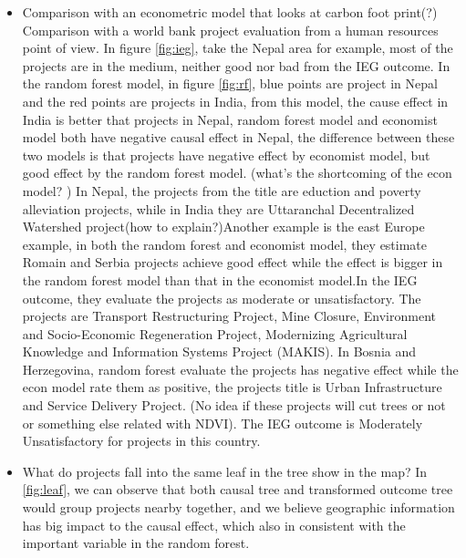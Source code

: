 \begin{itemize}
\item Comparison with an econometric model that looks at carbon foot print(?) Comparison with a world bank project evaluation from a human resources point of view.  In figure \ref{fig:ieg}, take the Nepal area for example, most of the projects are in the medium, neither good nor bad from the IEG outcome. In the random forest model, in figure \ref{fig:rf}, blue points are project in Nepal and the red points are projects in India, from this model, the cause effect in India is better that projects in Nepal, random forest model and economist model both have negative causal effect in Nepal, the difference between these two models is that projects have negative effect by economist model, but good effect by the random forest model. (what's the shortcoming of the econ model? ) In Nepal, the projects from the title are eduction and poverty alleviation projects, while in India they are Uttaranchal Decentralized Watershed project(how to explain?)Another example is the east Europe example, in both the random forest and economist model, they estimate Romain and Serbia projects achieve good effect while the effect is bigger in the random forest model than that in the economist model.In the IEG outcome, they evaluate the projects as moderate or unsatisfactory. The projects are Transport Restructuring Project, Mine Closure, Environment and Socio-Economic Regeneration Project, Modernizing Agricultural Knowledge and Information Systems Project (MAKIS).
In Bosnia and Herzegovina, random forest evaluate the projects has negative effect while the econ model rate them as positive, the projects title is Urban Infrastructure and Service Delivery Project. (No idea if these projects will cut trees or not or something else related with NDVI). The IEG outcome is Moderately Unsatisfactory for projects in this country. 


\item What do projects fall into the same leaf in the tree show in the map? In \ref{fig:leaf}, we can observe that both causal tree and transformed outcome tree would group projects nearby together, and we believe geographic information has big impact to the causal effect, which also in consistent with the important variable in the random forest. 

\end{itemize}
